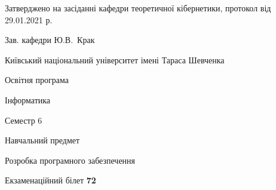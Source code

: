 \documentclass[10pt, ukrainian]{article}
\begin{document}
{\vspace{5mm}\smallskip \begin {small} Затверджено на засіданні кафедри теоретичної кібернетики, протокол  від   29.01.2021 р.\par\smallskip\smallskip
{\parbox {6.5 cm}{Зав. кафедри \dotfill Ю.В.~Крак}} \end{small}}
\newpage

{{\begin {small}\par
{ \center  Київський національний університет імені Тараса Шевченка \par}
{\parbox {5 cm}{Освітня програма \hfill}{\parbox {7 cm}{Інформатика \hfill}}\parbox {6 cm}{\hfill Семестр 6}}\par
{\parbox {5 cm} {Навчальний предмет \hfill}\parbox {7 cm}{Розробка програмного забезпечення \hfill}\parbox {6cm}{\hfill}\par}\vspace{-7pt} \end{small}}{\center Екзаменаційний білет \No \textbf
{ 72 }\par}}
\end{document}

